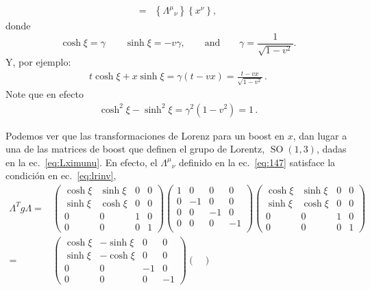 \begin{frame}
\begin{align}
=&\left\{{\Lambda^\mu}_{\nu}\right\}\left\{x^\nu\right\},
\end{align}
donde
\begin{equation}
  \cosh\xi=\gamma\qquad\sinh\xi=-v\gamma,\qquad\text{and}\qquad \gamma=\frac{1}{\sqrt{1-v^2}}.
\end{equation}
Y, por ejemplo:
\begin{align}
  t\cosh{\xi}+x\sinh\xi=\gamma(t-v x)=\frac{t-v x}{\sqrt{1-v^2}}\,.
\end{align}
Note que en efecto
\begin{align*}
 \cosh^2\xi - \sinh^2\xi = \gamma^2(1-v^2) = 1\,. 
\end{align*}

Podemos ver que las transformaciones de Lorenz para un boost en $x$, dan lugar a una de las matrices de boost que definen el grupo de Lorentz, $\operatorname{SO}(1,3)$, dadas en la ec.~\eqref{eq:Lximunu}. En efecto, el ${\Lambda^\mu}_{\nu}$ definido en la ec.~\eqref{eq:147} satisface la condición en ec.~\eqref{eq:lrinv}, 
\begin{align}
  \label{eq:boostx}
  \Lambda^T g \Lambda=&\begin{pmatrix}
    \cosh\xi&\sinh\xi&0&0\\
    \sinh\xi&\cosh\xi&0&0\\
    0     &  0  &1&0\\
    0     &  0  &0&1
  \end{pmatrix}
  \begin{pmatrix}
    1 & 0  & 0 &0\\
    0 & -1 & 0 &0\\
    0 & 0  & -1&0\\
    0 & 0  & 0 &-1\\
  \end{pmatrix}
  \begin{pmatrix}
    \cosh\xi&\sinh\xi&0&0\\
    \sinh\xi&\cosh\xi&0&0\\
    0     &  0  &1&0\\
    0     &  0  &0&1
  \end{pmatrix}\nonumber\\
  =&\begin{pmatrix}
       \cosh\xi&-\sinh\xi&0&0\\
    \sinh\xi&-\cosh\xi&0&0\\
    0     &  0  &-1&0\\
    0     &  0  &0&-1
  \end{pmatrix}
 \begin{pmatrix}

\end{pmatrix}
\end{align}
\end{frame}
